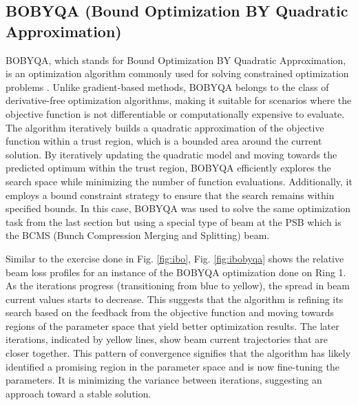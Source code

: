 \subsection{BOBYQA (Bound Optimization BY Quadratic Approximation)}

BOBYQA, which stands for Bound Optimization BY Quadratic Approximation, is an optimization algorithm commonly used for solving constrained optimization problems \cite{bobyqa}. Unlike gradient-based methods, BOBYQA belongs to the class of derivative-free optimization algorithms, making it suitable for scenarios where the objective function is not differentiable or computationally expensive to evaluate. The algorithm iteratively builds a quadratic approximation of the objective function within a trust region, which is a bounded area around the current solution. By iteratively updating the quadratic model and moving towards the predicted optimum within the trust region, BOBYQA efficiently explores the search space while minimizing the number of function evaluations. Additionally, it employs a bound constraint strategy to ensure that the search remains within specified bounds. In this case, BOBYQA was used to solve the same optimization task from the last section but using a special type of beam at the PSB which is the BCMS (Bunch Compression Merging and Splitting) beam.

Similar to the exercise done in Fig. \ref{fig:ibo}, Fig. \ref{fig:ibobyqa} shows the relative beam loss profiles for an instance of the  BOBYQA optimization done on Ring 1. As the iterations progress (transitioning from blue to yellow), the spread in beam current values starts to decrease. This suggests that the algorithm is refining its search based on the feedback from the objective function and moving towards regions of the parameter space that yield better optimization results. The later iterations, indicated by yellow lines, show beam current trajectories that are closer together. This pattern of convergence signifies that the algorithm has likely identified a promising region in the parameter space and is now fine-tuning the parameters. It is minimizing the variance between iterations, suggesting an approach toward a stable solution.

